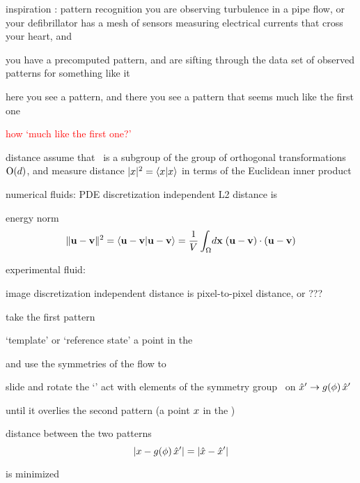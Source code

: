 \begin{frame}{inspiration : pattern recognition}
you are observing turbulence in a pipe flow, or your defibrillator has a
mesh of sensors measuring electrical currents that cross your heart, and

\medskip

you have a precomputed pattern, and are sifting through the data set of
observed patterns for something like it

\medskip

here you see a pattern, and there you see a pattern that seems much like
the first one

\bigskip

\bigskip

\textcolor{red}{\Large how `much like the first one?'}
\end{frame}

\begin{frame}{distance}
assume that \Group\
is a subgroup of the group of orthogonal transformations
$\textrm{O}(d)$, and measure
distance $|\ssp|^2=\braket{\ssp}{\ssp}$ in terms of the Euclidean inner
product

\bigskip
numerical fluids:  PDE discretization independent L2 distance is
\begin{block}{energy norm}
\[
  \Norm{\bu-\bv}^2  = \braket{\bu-\bv}{\bu-\bv}  = \frac{1}{V}
                \int_\bCell \! d \bx \;
                       (\bu-\bv) \cdot (\bu-\bv)
\]
\end{block}

\bigskip
experimental fluid:
\begin{block}{image discretization independent distance}
 is pixel-to-pixel distance, or ???
\end{block}
\end{frame}

\begin{frame}{}
take the first pattern
\begin{block}{`template' or `reference state'}
\hfill  a point {\slicep} in the \statesp\  \pS
\end{block}

and use the symmetries of the flow to
\begin{block}{slide and rotate the `{\template}'}
\hfill  act with elements of the symmetry group \Group\ on
${\hat{x}'} \to g({\bf \phi})\,{\hat{x}'}$
\end{block}
 until it overlies the second pattern (a point $x$ in
the \statesp)
\begin{block}{distance between the two patterns}
\[ %
|\ssp - \LieEl(\gSpace)\,\slicep|
    = |\sspRed - \slicep|
\] %
\end{block}
is minimized
\end{frame}


